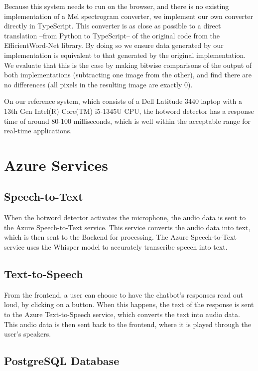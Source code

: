 \documentclass[a4paper,12pt,twoside]{ThesisStyle}
\begin{document}
Because this system needs to run on the browser, and there is no existing implementation of a Mel spectrogram converter, we implement our own converter directly in TypeScript. This converter is as close as possible to a direct translation --from Python to TypeScript-- of the original code from the EfficientWord-Net library. By doing so we ensure data generated by our implementation is equivalent to that generated by the original implementation. We evaluate that this is the case by making bitwise comparisons of the output of both implementations (subtracting one image from the other), and find there are no differences (all pixels in the resulting image are exactly 0).

On our reference system, which consists of a Dell Latitude 3440 laptop with a 13th Gen Intel(R) Core(TM) i5-1345U CPU, the hotword detector has a response time of around 80-100 milliseconds, which is well within the acceptable range for real-time applications.

\section{Azure Services}
\label{sec:azure_services}

\subsection{Speech-to-Text}
\label{subsec:speech_to_text}

When the hotword detector activates the microphone, the audio data is sent to the Azure Speech-to-Text service. This service converts the audio data into text, which is then sent to the Backend for processing. The Azure Speech-to-Text service uses the Whisper \cite{Radford2022RobustSpeechRecognitionLargeScale} model to accurately transcribe speech into text.

\subsection{Text-to-Speech}
\label{subsec:text_to_speech}

From the frontend, a user can choose to have the chatbot's responses read out loud, by clicking on a button. When this happens, the text of the response is sent to the Azure Text-to-Speech service, which converts the text into audio data. This audio data is then sent back to the frontend, where it is played through the user's speakers.

\subsection{PostgreSQL Database}
\label{subsec:database}
\end{document}
